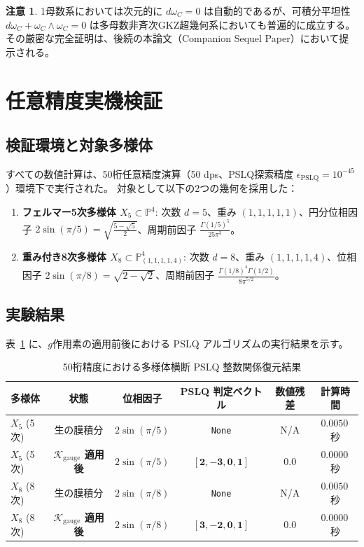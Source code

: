 \documentclass[11pt,a4paper]{article}
\theoremstyle{definition}
\newtheorem{remark}{注意}
\begin{document}
\begin{remark}
1母数系においては次元的に $d\omega_C = 0$ は自動的であるが、可積分平坦性 $d\omega_C + \omega_C \wedge \omega_C = 0$ は多母数非斉次GKZ超幾何系においても普遍的に成立する。その厳密な完全証明は、後続の本論文（Companion Sequel Paper）において提示される。
\end{remark}

\section{任意精度実機検証}

\subsection{検証環境と対象多様体}
すべての数値計算は、50桁任意精度演算（50 dps、PSLQ探索精度 $\epsilon_{\text{PSLQ}} = 10^{-45}$）環境下で実行された。
対象として以下の2つの幾何を採用した：
\begin{enumerate}
    \item \textbf{フェルマー5次多様体 $X_5 \subset \mathbb{P}^4$}: 次数 $d=5$、重み $(1,1,1,1,1)$、円分位相因子 $2\sin(\pi/5) = \sqrt{\frac{5-\sqrt{5}}{2}}$、周期前因子 $\frac{\Gamma(1/5)^5}{25\pi^3}$。
    \item \textbf{重み付き8次多様体 $X_8 \subset \mathbb{P}^4_{(1,1,1,1,4)}$}: 次数 $d=8$、重み $(1,1,1,1,4)$、位相因子 $2\sin(\pi/8) = \sqrt{2-\sqrt{2}}$、周期前因子 $\frac{\Gamma(1/8)^4\Gamma(1/2)}{8\pi^{5/2}}$。
\end{enumerate}

\subsection{実験結果}

表~\ref{tab:pslq_benchmark_ja} に、$g$作用素の適用前後における PSLQ アルゴリズムの実行結果を示す。

\begin{table}[htbp]
\centering
\caption{50桁精度における多様体横断 PSLQ 整数関係復元結果}
\label{tab:pslq_benchmark_ja}
\small
\begin{tabular}{lccccc}
\toprule
\textbf{多様体} & \textbf{状態} & \textbf{位相因子} & \textbf{PSLQ 判定ベクトル} & \textbf{数値残差} & \textbf{計算時間} \\
\midrule
$X_5$ (5次) & 生の膜積分 & $2\sin(\pi/5)$ & \texttt{None} & N/A & $0.0050$\,秒 \\
$X_5$ (5次) & \textbf{$\mathcal{K}_{\text{gauge}}$ 適用後} & $2\sin(\pi/5)$ & $\mathbf{[2, -3, 0, 1]}$ & $\mathbf{0.0}$ & $\mathbf{0.0000}$\,秒 \\
\midrule
$X_8$ (8次) & 生の膜積分 & $2\sin(\pi/8)$ & \texttt{None} & N/A & $0.0050$\,秒 \\
$X_8$ (8次) & \textbf{$\mathcal{K}_{\text{gauge}}$ 適用後} & $2\sin(\pi/8)$ & $\mathbf{[3, -2, 0, 1]}$ & $\mathbf{0.0}$ & $\mathbf{0.0000}$\,秒 \\
\bottomrule
\end{tabular}
\end{table}
\end{document}
